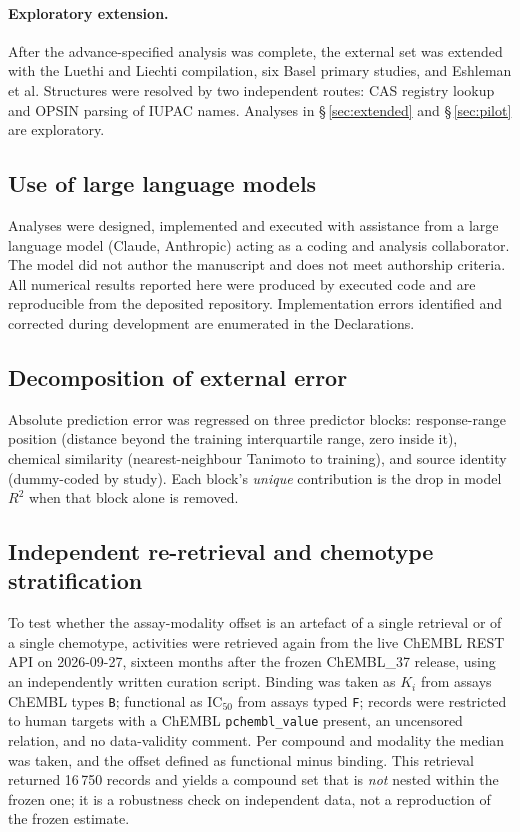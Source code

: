 \documentclass[11pt,a4paper]{article}
\begin{document}
\paragraph{Exploratory extension.} After the advance-specified analysis was complete, the
external set was extended with the Luethi and Liechti compilation,\cite{Luethi2020} six
Basel primary studies,\cite{Simmler2013,Simmler2014,Rickli2015a,Rickli2015b,Luethi2019,Kolaczynska2019}
and Eshleman et al.\cite{Eshleman2017} Structures were resolved by two independent routes:
CAS registry lookup and OPSIN parsing of IUPAC names.\cite{Lowe2011} Analyses in
\S\,\ref{sec:extended} and \S\,\ref{sec:pilot} are exploratory.

\subsection{Use of large language models}
Analyses were designed, implemented and executed with assistance from a large
language model (Claude, Anthropic) acting as a coding and analysis collaborator. The
model did not author the manuscript and does not meet authorship criteria. All
numerical results reported here were produced by executed code and are reproducible
from the deposited repository. Implementation errors identified and corrected during
development are enumerated in the Declarations.

\subsection{Decomposition of external error}
Absolute prediction error was regressed on three predictor blocks: response-range
position (distance beyond the training interquartile range, zero inside it), chemical
similarity (nearest-neighbour Tanimoto to training), and source identity (dummy-coded
by study). Each block's \emph{unique} contribution is the drop in model $R^2$ when that
block alone is removed.

\subsection{Independent re-retrieval and chemotype stratification}
\label{sec:rederivation}
To test whether the assay-modality offset is an artefact of a single retrieval or of
a single chemotype, activities were retrieved again from the live ChEMBL REST API on
2026-09-27, sixteen months after the frozen ChEMBL\_37 release, using an
independently written curation script. Binding was taken as $K_i$ from assays ChEMBL
types \texttt{B}; functional as IC$_{50}$ from assays typed \texttt{F}; records were
restricted to human targets with a ChEMBL \texttt{pchembl\_value} present, an
uncensored relation, and no data-validity comment. Per compound and modality the
median was taken, and the offset defined as functional minus binding. This retrieval
returned 16\,750 records and yields a compound set that is \emph{not} nested within
the frozen one; it is a robustness check on independent data, not a reproduction of
the frozen estimate.
\end{document}
